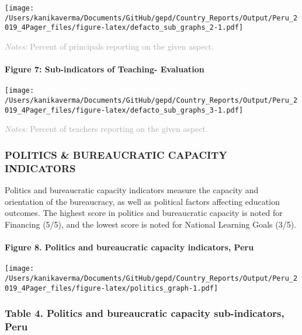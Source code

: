 \documentclass[
  twocolumn]{article}
\begin{document}
\texttt{[image: /Users/kanikaverma/Documents/GitHub/gepd/Country\_Reports/Output/Peru\_2019\_4Pager\_files/figure-latex/defacto\_sub\_graphs\_2-1.pdf]}

{\scriptsize
    \textcolor{darkgray}{\textit{Notes:} Percent of principals reporting on the given aspect.}
  }

\hypertarget{figure-7-sub-indicators-of-teaching--evaluation}{%
\paragraph{Figure 7: Sub-indicators of Teaching-
Evaluation}\label{figure-7-sub-indicators-of-teaching--evaluation}}

\texttt{[image: /Users/kanikaverma/Documents/GitHub/gepd/Country\_Reports/Output/Peru\_2019\_4Pager\_files/figure-latex/defacto\_sub\_graphs\_3-1.pdf]}

{\scriptsize
    \textcolor{darkgray}{\textit{Notes:} Percent of teachers reporting on the given aspect.}
  }

\vfill\null

\hypertarget{politics-bureaucratic-capacity-indicators}{%
\subsubsection{\texorpdfstring{\textbf{POLITICS \& BUREAUCRATIC CAPACITY
INDICATORS}}{POLITICS \& BUREAUCRATIC CAPACITY INDICATORS}}\label{politics-bureaucratic-capacity-indicators}}

Politics and bureaucratic capacity indicators measure the capacity and
orientation of the bureaucracy, as well as political factors affecting
education outcomes. The highest score in politics and bureaucratic
capacity is noted for Financing (5/5), and the lowest score is noted for
National Learning Goals (3/5).

\hypertarget{figure-8.-politics-and-bureaucratic-capacity-indicators-peru}{%
\paragraph{Figure 8. Politics and bureaucratic capacity indicators,
Peru}\label{figure-8.-politics-and-bureaucratic-capacity-indicators-peru}}

\texttt{[image: /Users/kanikaverma/Documents/GitHub/gepd/Country\_Reports/Output/Peru\_2019\_4Pager\_files/figure-latex/politics\_graph-1.pdf]}

\hypertarget{table-4.-politics-and-bureaucratic-capacity-sub-indicators-peru}{%
\subsubsection{Table 4. Politics and bureaucratic capacity
sub-indicators,
Peru}\label{table-4.-politics-and-bureaucratic-capacity-sub-indicators-peru}}
\end{document}
